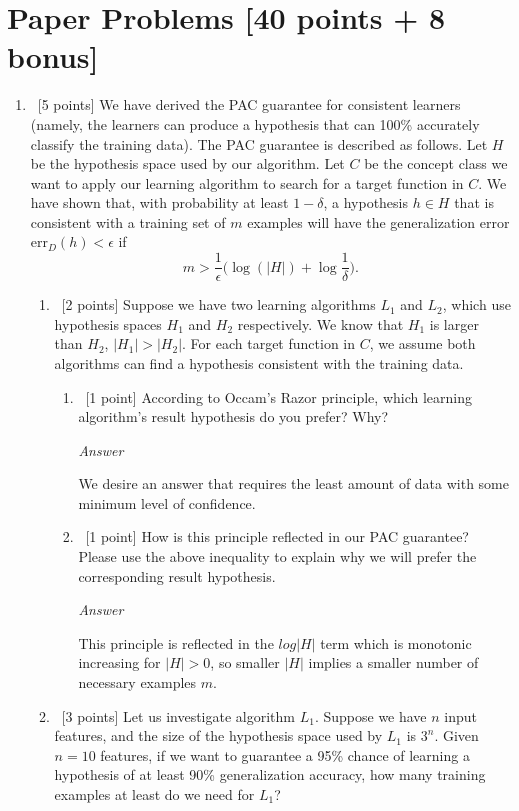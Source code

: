 \documentclass[12pt, fullpage,letterpaper]{article}
\begin{document}
\section{Paper Problems [40 points + 8 bonus]}
\begin{enumerate}
\item~[5 points] We have derived the PAC guarantee for consistent learners (namely, the learners can produce a hypothesis that can 100\% accurately classify the training data). The PAC guarantee is described as follows. Let $H$ be the hypothesis space used by our algorithm. Let $C$ be the concept class we want to apply our learning algorithm to search for a target function in $C$. We have shown that,  with probability at least $1-\delta$, a hypothesis $h\in H$ that is consistent with a training set of $m$ examples will have the generalization error $\mathrm{err}_D(h) < \epsilon$ if 
\[
m > \frac{1}{\epsilon}\big(\log(|H|) + \log\frac{1}{\delta}\big).
\]

\begin{enumerate}
	\item~[2 points] Suppose we have two learning algorithms $L_1$ and $L_2$, which use hypothesis spaces $H_1$ and $H_2$ respectively. We know that $H_1$ is larger than $H_2$, \ie $|H_1| > |H_2|$.
	For each target function in $C$, we assume both algorithms can find a hypothesis consistent with the training data. 
	\begin{enumerate}
		\item~[1 point] According to Occam's Razor principle, which learning algorithm's  result hypothesis do you prefer? Why?
		
		\emph{Answer}
		
		We desire an answer that requires the least amount of data with some minimum level of confidence.
		
		\item~[1 point]  How is this principle reflected in our PAC guarantee? Please use the above inequality to explain why we will prefer the corresponding result hypothesis. 
		
		\emph{Answer}
		
		This principle is reflected in the $log|H|$ term which is monotonic increasing for $|H|>0$, so smaller $|H|$ implies a smaller number of necessary examples $m$.
		
	\end{enumerate}
	\item~[3 points] Let us investigate algorithm $L_1$. Suppose we have $n$ input features, and the size of the hypothesis space used by $L_1$ is $3^n$. Given $n=10$ features, if we want to guarantee a 95\% chance of learning a hypothesis of at least 90\% generalization accuracy, how many training examples at least do we need for $L_1$?\
	

\end{enumerate}
\end{enumerate}
\end{document}
